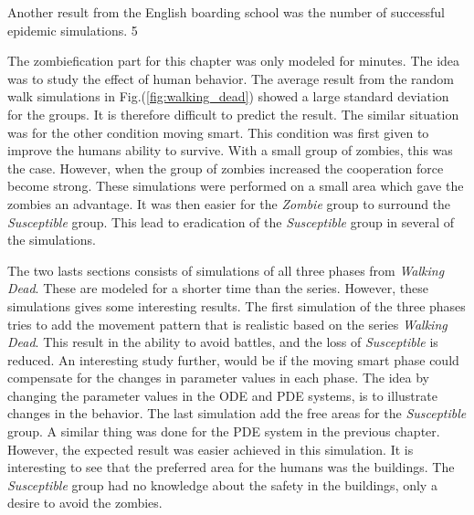 \documentclass[%
twoside,                 %
final,                   %
chapterprefix=true,      %
open=right               %
10pt]{book}
\begin{document}
\vspace{3mm}




\vspace{3mm}


Another result from the English boarding school was the number of successful epidemic simulations. 5 %


\vspace{3mm}




\vspace{3mm}


The zombiefication part for this chapter was only modeled for minutes. The idea was to study the effect of human behavior. The average result from the random walk simulations in Fig.(\ref{fig:walking_dead}) showed a large standard deviation for the groups. It is therefore difficult to predict the result. The similar situation was for the other condition moving smart. This condition was first given to improve the humans ability to survive. With a small group of zombies, this was the case. However, when the group of zombies increased the cooperation force become strong. These simulations were performed on a small area which gave the zombies an advantage. It was then easier for the \emph{Zombie} group to surround the \emph{Susceptible} group. This lead to eradication of the \emph{Susceptible} group in several of the simulations.


\vspace{3mm}




\vspace{3mm}


The two lasts sections consists of simulations of all three phases from \emph{Walking Dead}. These are modeled for a shorter time than the series. However, these simulations gives some interesting results. The first simulation of the three phases tries to add the movement pattern that is realistic based on the series \emph{Walking Dead}. This result in the ability to avoid battles, and the loss of \emph{Susceptible} is reduced. An interesting study further, would be if the moving smart phase could compensate for the changes in parameter values in each phase. The idea by changing the parameter values in the ODE and PDE systems, is to illustrate changes in the behavior. The last simulation add the free areas for the \emph{Susceptible} group. A similar thing was done for the PDE system in the previous chapter. However, the expected result was easier achieved in this simulation. It is interesting to see that the preferred area for the humans was the buildings. The \emph{Susceptible} group had no knowledge about the safety in the buildings, only a desire to avoid the zombies. 
\end{document}
